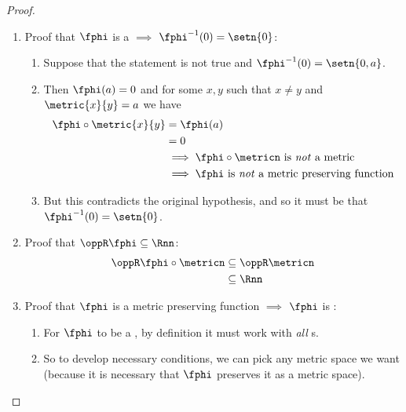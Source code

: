 \begin{proof}
\begin{enumerate}
  \item Proof that $\fphi$ is a  $\implies$ $\fphi^{-1}(0) = \setn{0}$:
    \begin{enumerate}
      \item Suppose that the statement is not true and $\fphi^{-1}(0) = \setn{0,a}$.
      \item Then $\fphi(a)=0$ and for some $x,y$ such that $x\neq y$ and $\metric{x}{y}=a$ we have
        \begin{align*}
          \fphi\circ\metric{x}{y}
            &= \fphi(a)
          \\&= 0
          \\&\implies \text{$\fphi\circ\metricn$ is \emph{not} a metric}
          \\&\implies \text{$\fphi$ is \emph{not} a metric preserving function}
        \end{align*}
      \item But this contradicts the original hypothesis, and so it must be that $\fphi^{-1}(0) = \setn{0}$.
    \end{enumerate}

  \item Proof that $\oppR\fphi \subseteq \Rnn$:
    \begin{align*}
      \oppR\fphi\circ\metricn
        &\subseteq \oppR\metricn
      \\&\subseteq \Rnn
    \end{align*}

  \item Proof that $\fphi$ is a metric preserving function $\implies$ $\fphi$ is :
    \begin{enumerate}
      \item For $\fphi$ to be a , 
            by definition it must work with \emph{all} s.
      
      \item So to develop necessary conditions, we can pick any metric space we want
            (because it is necessary that $\fphi$ preserves it as a metric space).
      

\end{enumerate}
\end{enumerate}
\end{proof}
